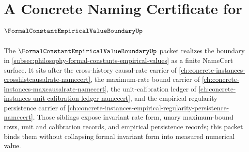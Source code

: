 \chapter{A Concrete Naming Certificate for $\FormalConstantEmpiricalValueBoundaryUp$}
\label{ch:concrete-instances-formalconstantempiricalvalueboundary-namecert}

The $\FormalConstantEmpiricalValueBoundaryUp$ packet realizes the boundary in \autoref{subsec:philosophy-formal-constants-empirical-values} as a finite NameCert surface. It sits after the cross-history causal-rate carrier of \autoref{ch:concrete-instances-crosshistcausalrate-namecert}, the maximum-rate bound carrier of \autoref{ch:concrete-instances-maxcausalrate-namecert}, the unit-calibration ledger of \autoref{ch:concrete-instances-unit-calibration-ledger-namecert}, and the empirical-regularity persistence carrier of \autoref{ch:concrete-instances-empirical-regularity-persistence-namecert}. Those siblings expose invariant rate form, unary maximum-bound rows, unit and calibration records, and empirical persistence records; this packet binds them without collapsing formal invariant form into measured numerical value.

